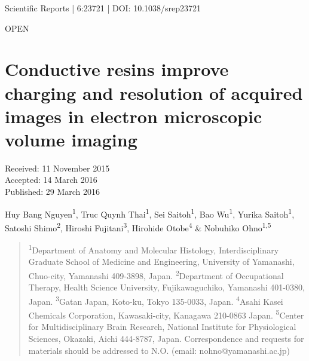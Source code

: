 \documentclass{article}
\begin{document}


\noindent Scientific Reports | 6:23721 | DOI: 10.1038/srep23721\par
\noindent OPEN\par

\section*{Conductive resins improve charging and resolution of acquired images in electron microscopic volume imaging}

\noindent Received: 11 November 2015\\
Accepted: 14 March 2016\\
Published: 29 March 2016\par
{}

\noindent Huy Bang Nguyen\textsuperscript{1}, Truc Quynh Thai\textsuperscript{1}, Sei Saitoh\textsuperscript{1}, Bao Wu\textsuperscript{1}, Yurika Saitoh\textsuperscript{1}, Satoshi Shimo\textsuperscript{2}, Hiroshi Fujitani\textsuperscript{3}, Hirohide Otobe\textsuperscript{4} \& Nobuhiko Ohno\textsuperscript{1,5}

\begin{quote}\small
\noindent \textsuperscript{1}Department of Anatomy and Molecular Histology, Interdisciplinary Graduate School of Medicine and Engineering, University of Yamanashi, Chuo-city, Yamanashi 409-3898, Japan. \textsuperscript{2}Department of Occupational Therapy, Health Science University, Fujikawaguchiko, Yamanashi 401-0380, Japan. \textsuperscript{3}Gatan Japan, Koto-ku, Tokyo 135-0033, Japan. \textsuperscript{4}Asahi Kasei Chemicals Corporation, Kawasaki-city, Kanagawa 210-0863 Japan. \textsuperscript{5}Center for Multidisciplinary Brain Research, National Institute for Physiological Sciences, Okazaki, Aichi 444-8787, Japan. Correspondence and requests for materials should be addressed to N.O. (email: nohno@yamanashi.ac.jp)
\end{quote}
\end{document}
